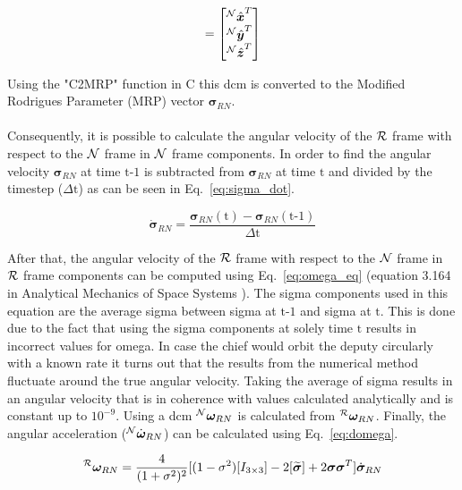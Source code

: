 \begin{equation}
    [RN] = \begin{bmatrix}
            {^{\cal N}\hat{{\bm x}}}^{T}\\ 
            {^{\cal N}\hat{{\bm y}}}^{T}\\ 
            {^{\cal N}\hat{{\bm z}}}^{T}
            \end{bmatrix}
            \label{eq:dcm_RN}
\end{equation}

Using the "C2MRP" function in C this dcm is converted to the Modified Rodrigues Parameter (MRP) vector ${\bm \sigma}_{RN}$.\\
\\
Consequently, it is possible to calculate the angular velocity of the $\cal R$ frame with respect to the $\cal N$ frame in $\cal N$ frame components. In order to find the angular velocity ${\bm \sigma}_{RN}$ at time $\textrm{t-1}$ is subtracted from ${\bm \sigma}_{RN}$ at time $\textrm{t}$  and divided by the timestep ($\Delta \textrm{t}$) as can be seen in Eq.~\eqref{eq:sigma_dot}.

\begin{equation}
    \dot{\bm \sigma}_{RN} = \frac{{\bm \sigma}_{RN}(\textrm{t}) - {\bm \sigma}_{RN}(\textrm{t-1})}{\Delta \textrm{t}}
    \label{eq:sigma_dot}
\end{equation}

After that, the angular velocity of the $\cal R$ frame with respect to the $\cal N$ frame in $\cal R$ frame components can be computed using Eq.~\eqref{eq:omega_eq} (equation 3.164 in Analytical Mechanics of Space Systems \cite{Schaub}). The sigma components used in this equation are the average sigma between sigma at $\textrm{t-1}$ and sigma at $\textrm{t}$. This is done due to the fact that using the sigma components at solely time $\textrm{t}$ results in incorrect values for omega. In case the chief would orbit the deputy circularly with a known rate it turns out that the results from the numerical method fluctuate around the true angular velocity. Taking the average of sigma results in an angular velocity that is in coherence with values calculated analytically and is constant up to $10^{-9}$. Using a dcm $^{\cal N}{\bm \omega}_{RN}$ is calculated from $^{\cal R}{\bm \omega}_{RN}$. Finally, the angular acceleration ($^{\cal N}\dot{\bm \omega}_{RN}$) can be calculated using Eq.~\eqref{eq:domega}.

\begin{equation}
    ^{\cal R}{\bm \omega}_{RN} = \frac{4}{(1 + \sigma^{2})^{2}}[(1-\sigma^{2})[I_{3 \times 3}] - 2[\widetilde{\bm \sigma}] + 2{\bm \sigma}{\bm \sigma}^{T}]\dot{\bm \sigma}_{RN}
    \label{eq:omega_eq}
\end{equation}

